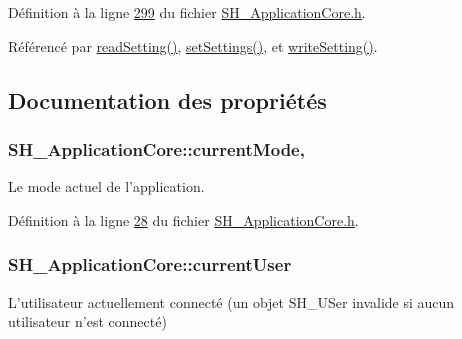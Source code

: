Définition à la ligne \hyperlink{SH__ApplicationCore_8h_source_l00299}{299} du fichier \hyperlink{SH__ApplicationCore_8h_source}{S\-H\-\_\-\-Application\-Core.\-h}.



Référencé par \hyperlink{classSH__ApplicationCore_a9feb9d83185f8ba1f99125b06f381436}{read\-Setting()}, \hyperlink{classSH__ApplicationCore_a04f612b13a53b442a94c66598eea2907}{set\-Settings()}, et \hyperlink{classSH__ApplicationCore_af58caab2fbbdc5a5c0dd0d162aa643ef}{write\-Setting()}.



\subsection{Documentation des propriétés}
\hypertarget{classSH__ApplicationCore_ac83ee9ad9c649105eb8eac5fac74b951}{
\subsubsection[{current\-Mode}]{\setlength{\rightskip}{0pt plus 5cm}S\-H\-\_\-\-Application\-Core\-::current\-Mode\hspace{0.3cm}{\ttfamily [read]}, {\ttfamily [write]}}}\label{classSH__ApplicationCore_ac83ee9ad9c649105eb8eac5fac74b951}


Le mode actuel de l'application. 



Définition à la ligne \hyperlink{SH__ApplicationCore_8h_source_l00028}{28} du fichier \hyperlink{SH__ApplicationCore_8h_source}{S\-H\-\_\-\-Application\-Core.\-h}.

\hypertarget{classSH__ApplicationCore_aaa2609e7bcda83fd65b602e7e211b027}{
\subsubsection[{current\-User}]{\setlength{\rightskip}{0pt plus 5cm}S\-H\-\_\-\-Application\-Core\-::current\-User\hspace{0.3cm}{\ttfamily [read]}}}\label{classSH__ApplicationCore_aaa2609e7bcda83fd65b602e7e211b027}


L'utilisateur actuellement connecté (un objet S\-H\-\_\-\-U\-Ser invalide si aucun utilisateur n'est connecté) 



